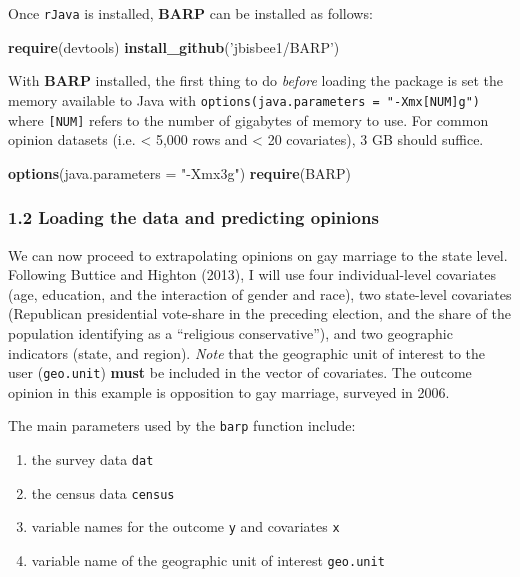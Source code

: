 \documentclass[]{article}
\newenvironment{Shaded}{\begin{snugshade}}{\end{snugshade}}
\newcommand{\KeywordTok}[1]{\textcolor[rgb]{0.13,0.29,0.53}{\textbf{#1}}}
\newcommand{\DataTypeTok}[1]{\textcolor[rgb]{0.13,0.29,0.53}{#1}}
\newcommand{\StringTok}[1]{\textcolor[rgb]{0.31,0.60,0.02}{#1}}
\newcommand{\NormalTok}[1]{#1}
\providecommand{\tightlist}{%
  \setlength{\itemsep}{0pt}\setlength{\parskip}{0pt}}
\begin{document}
Once \texttt{rJava} is installed, \textbf{BARP} can be installed as
follows:

\begin{Shaded}
\begin{Highlighting}[]
\KeywordTok{require}\NormalTok{(devtools)}
\KeywordTok{install_github}\NormalTok{(}\StringTok{'jbisbee1/BARP'}\NormalTok{)}
\end{Highlighting}
\end{Shaded}

With \textbf{BARP} installed, the first thing to do \emph{before}
loading the package is set the memory available to Java with
\texttt{options(java.parameters\ =\ "-Xmx{[}NUM{]}g")} where
\texttt{{[}NUM{]}} refers to the number of gigabytes of memory to use.
For common opinion datasets (i.e. \textless{} 5,000 rows and \textless{}
20 covariates), 3 GB should suffice.

\begin{Shaded}
\begin{Highlighting}[]
\KeywordTok{options}\NormalTok{(}\DataTypeTok{java.parameters =} \StringTok{"-Xmx3g"}\NormalTok{)}
\KeywordTok{require}\NormalTok{(BARP)}
\end{Highlighting}
\end{Shaded}

\subsubsection{1.2 Loading the data and predicting
opinions}\label{loading-the-data-and-predicting-opinions}

We can now proceed to extrapolating opinions on gay marriage to the
state level. Following Buttice and Highton (2013), I will use four
individual-level covariates (age, education, and the interaction of
gender and race), two state-level covariates (Republican presidential
vote-share in the preceding election, and the share of the population
identifying as a ``religious conservative''), and two geographic
indicators (state, and region). \emph{Note} that the geographic unit of
interest to the user (\texttt{geo.unit}) \textbf{must} be included in
the vector of covariates. The outcome opinion in this example is
opposition to gay marriage, surveyed in 2006.

The main parameters used by the \texttt{barp} function include:

\begin{enumerate}
\def\labelenumi{\arabic{enumi}.}
\tightlist
\item
  the survey data \texttt{dat}
\item
  the census data \texttt{census}
\item
  variable names for the outcome \texttt{y} and covariates \texttt{x}
\item
  variable name of the geographic unit of interest \texttt{geo.unit}
\end{enumerate}
\end{document}
